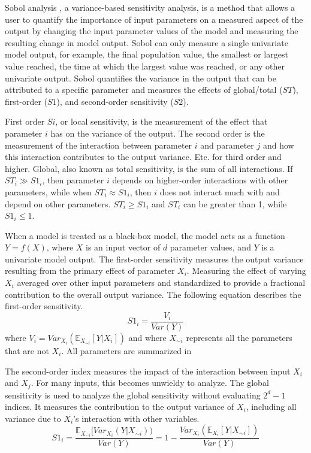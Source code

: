 Sobol analysis \cite{sobolGlobalSensitivityIndices2001}, a variance-based sensitivity analysis, is a method that allows a user to quantify the importance of input parameters on a measured aspect of the output by changing the input parameter values of the model and measuring the resulting change in model output.
Sobol can only measure a single univariate model output, for example, the final population value, the smallest or largest value reached, the time at which the largest value was reached, or any other univariate output. 
Sobol quantifies the variance in the output that can be attributed to a specific parameter and measures the effects of global/total ($ST$), first-order ($S1$), and second-order sensitivity ($S2$). 

First order $Si$, or local sensitivity, is the measurement of the effect that parameter $i$ has on the variance of the output. 
The second order is the measurement of the interaction between parameter $i$ and parameter $j$ and how this interaction contributes to the output variance. 
Etc. for third order and higher. 
Global, also known as total sensitivity, is the sum of all interactions. 
If $ST_i \gg S1_i$, then parameter $i$ depends on higher-order interactions with other parameters, while when $ST_i \approx S1_i$, then $i$ does not interact much with and depend on other parameters.
$ST_i \geq S1_i$ and $ST_i$ can be greater than 1, while $S1_i \leq 1$. 

When a model is treated as a black-box model, the model acts as a function $Y=f(X)$, where $X$ is an input vector of $d$ parameter values, and $Y$ is a univariate model output.
The first-order sensitivity measures the output variance resulting from the primary effect of parameter $X_i$.
Measuring the effect of varying $X_i$ averaged over other input parameters and standardized to provide a fractional contribution to the overall output variance.
The following equation describes the first-order sensitivity. 
\[
 S1_i = \frac{V_i}{\textit{Var}(Y)}
\] where $V_i = \textit{Var}_{X_i}(\mathbb{E}_{X_{\sim i}}[Y|X_i])$ and where $X_{\sim i}$ represents all the parameters that are not $X_i$.
All parameters are summarized in 

The second-order index measures the impact of the interaction between input $X_i$ and $X_j$. 
For many inputs, this becomes unwieldy to analyze.
The global sensitivity is used to analyze the global sensitivity without evaluating $2^d-1$ indices. 
It measures the contribution to the output variance of $X_i$, including all variance due to $ X_i$'s interaction with other variables.
\[
 S1_i = \frac{\mathbb{E}_{X_{\sim i}}[\textit{Var}_{X_i}(Y|X_{\sim i}))}{\textit{Var}(Y)} = 1 - \frac{\textit{Var}_{X_i}(\mathbb{E}_{X_i}[Y|X_{\sim i}])}{\textit{Var}(Y)}
\]

